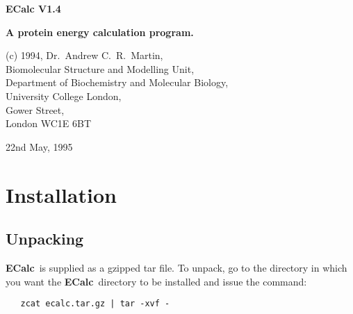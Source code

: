 \documentclass[12pt]{article}
\newcommand{\ecalc}{\mbox{\bf ECalc}}
\newcommand{\ec}{\mbox{\bf EC}}
\begin{document}
\begin{center}
{\Large\bf ECalc V1.4}
\large

{\bf A protein energy calculation program.}
\vspace{1em}

(c) 1994, Dr.\ Andrew C.\ R.\ Martin,\\
Biomolecular Structure and Modelling Unit,\\
Department of Biochemistry and Molecular Biology,\\
University College London,\\
Gower Street,\\
London WC1E 6BT\\
\vspace{1em}

22nd May, 1995
\vspace{2em}

\end{center}

\begin{abstract}
   \ecalc\ is a program designed to calculate the energy of a protein. It
may also be used to calculate the energies of a number of conformations 
of a region within a protein. The calculations may be restricted to
the region of interest (though non-bonded contacts with other parts of
the protein will also be considered). In addition, other parts of the
protein may be specified which should be excluded from consideration
in the non-bonded contact calculations. Parts of the potential may be
switched on or off and scaled with respect to one another. This
allows, for example, the simple calculation of just the van der Waals
repulsion or just the bond energy.

   The program may be run using a control file (as described below),
or using an X-windows interface (\ec) on machines equipped with the
Tcl/Tk package. This interface builds a control file and spawns the
normal \ecalc\ program to perform the calculations.
\end{abstract}


\section{Installation}


\subsection{Unpacking}
\ecalc\ is supplied as a gzipped tar file. To unpack, go to the directory
in which you want the \ecalc\ directory to be installed and issue the
command:
\begin{verbatim}
   zcat ecalc.tar.gz | tar -xvf -
\end{verbatim}
\end{document}
